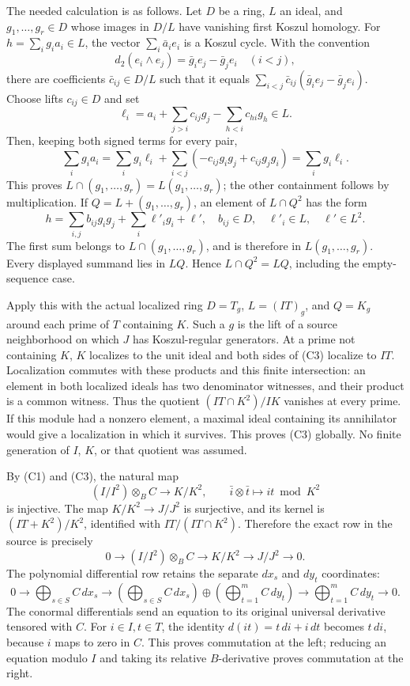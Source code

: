 The needed calculation is as follows. Let \(D\) be a ring, \(L\) an ideal, and \(g_1,\ldots,g_r\in D\) whose images in \(D/L\) have vanishing first Koszul homology. For \(h=\sum_i g_i a_i\in L\), the vector \(\sum_i\bar a_i e_i\) is a Koszul cycle. With the convention \[
 d_2(e_i\wedge e_j)=\bar g_i e_j-\bar g_j e_i\quad(i<j),
\] there are coefficients \(\bar c_{ij}\in D/L\) such that it equals \(\sum_{i<j}\bar c_{ij}(\bar g_i e_j-\bar g_j e_i)\). Choose lifts \(c_{ij}\in D\) and set \[
 \ell_i=a_i+\sum_{j>i}c_{ij}g_j-\sum_{h<i}c_{hi}g_h\in L.
\] Then, keeping both signed terms for every pair, \[
 \sum_i g_i a_i
 =\sum_i g_i\ell_i+
   \sum_{i<j}(-c_{ij}g_i g_j+c_{ij}g_j g_i)
 =\sum_i g_i\ell_i.
\] This proves \(L\cap(g_1,\ldots,g_r)=L(g_1,\ldots,g_r)\); the other containment follows by multiplication. If \(Q=L+(g_1,\ldots,g_r)\), an element of \(L\cap Q^2\) has the form \[
 h=\sum_{i,j}b_{ij}g_i g_j+\sum_i\ell'_i g_i+\ell',
 \quad b_{ij}\in D,\quad\ell'_i\in L,\quad\ell'\in L^2.
\] The first sum belongs to \(L\cap(g_1,\ldots,g_r)\), and is therefore in \(L(g_1,\ldots,g_r)\). Every displayed summand lies in \(LQ\). Hence \(L\cap Q^2=LQ\), including the empty-sequence case.

Apply this with the actual localized ring \(D=T_g\), \(L=(IT)_g\), and \(Q=K_g\) around each prime of \(T\) containing \(K\). Such a \(g\) is the lift of a source neighborhood on which \(J\) has Koszul-regular generators. At a prime not containing \(K\), \(K\) localizes to the unit ideal and both sides of (C3) localize to \(IT\). Localization commutes with these products and this finite intersection: an element in both localized ideals has two denominator witnesses, and their product is a common witness. Thus the quotient \((IT\cap K^2)/IK\) vanishes at every prime. If this module had a nonzero element, a maximal ideal containing its annihilator would give a localization in which it survives. This proves (C3) globally. No finite generation of \(I\), \(K\), or that quotient was assumed.

By (C1) and (C3), the natural map \[
 (I/I^2)\otimes_B C\longrightarrow K/K^2,\qquad
 \bar i\otimes\bar t\longmapsto it\bmod K^2
\] is injective. The map \(K/K^2\to J/J^2\) is surjective, and its kernel is \((IT+K^2)/K^2\), identified with \(IT/(IT\cap K^2)\). Therefore the exact row in the source is precisely \[
 0\longrightarrow (I/I^2)\otimes_B C
 \longrightarrow K/K^2\longrightarrow J/J^2\longrightarrow0.
\tag{C4}
\] The polynomial differential row retains the separate \(dx_s\) and \(dy_t\) coordinates: \[
 0\longrightarrow
 \bigoplus_{s\in S}C\,dx_s
 \longrightarrow
 \left(\bigoplus_{s\in S}C\,dx_s\right)\oplus
 \left(\bigoplus_{t=1}^{m}C\,dy_t\right)
 \longrightarrow
 \bigoplus_{t=1}^{m}C\,dy_t
 \longrightarrow0.
\tag{C5}
\] The conormal differentials send an equation to its original universal derivative tensored with \(C\). For \(i\in I,t\in T\), the identity \(d(it)=t\,di+i\,dt\) becomes \(t\,di\), because \(i\) maps to zero in \(C\). This proves commutation at the left; reducing an equation modulo \(I\) and taking its relative \(B\)-derivative proves commutation at the right.

